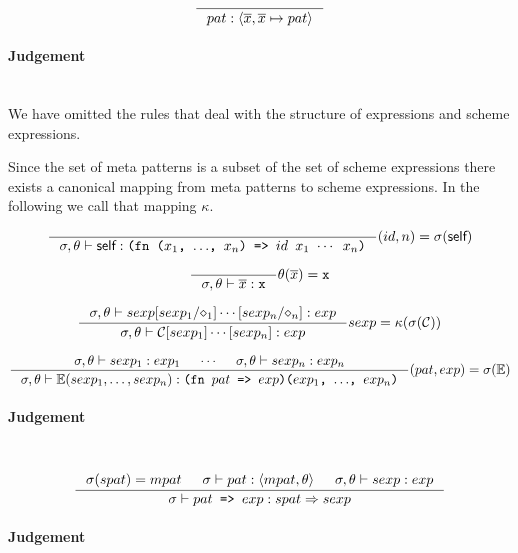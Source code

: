\[
\inference
{
}
{
  pat : \langle \overline{x}, \overline{x} \mapsto pat \rangle
}
\]

\paragraph{Judgement} \\

We have omitted the rules that deal with the structure of expressions and scheme
expressions.

Since the set of meta patterns is a subset of the set of scheme expressions
there exists a canonical mapping from meta patterns to scheme expressions. In
the following we call that mapping $\kappa$.


\[
\inference
{
}
{
  \sigma, \theta |- \textsf{self} : \texttt{(fn ($x_1$, $\ldots$, $x_n$) => $id$ $x_1$ $\cdots$ $x_n$)}
}
{
  (id, n) = \sigma(\textsf{self})
}
\]

\[
\inference
{
}
{
  \sigma, \theta |- \overline{x} : \texttt{x}
}
{
  \theta(\overline{x}) = \texttt{x}
}
\]

\[
\inference
{
  \sigma, \theta |- sexp[sexp_1/\diamond_1]\cdots[sexp_n/\diamond_n] : exp
}
{
  \sigma, \theta |- \mathcal{C}[sexp_1]\cdots[sexp_n] : exp
}
{
  sexp = \kappa(\sigma(\mathcal{C}))
}
\]

\[
\inference
{
  \sigma, \theta |- sexp_1 : exp_1 &
  \cdots &
  \sigma, \theta |- sexp_n : exp_n
}
{
  \sigma, \theta |- \mathbb{E}(sexp_1, \ldots, sexp_n) :
  \texttt{(fn $pat$ => $exp$)($exp_1$, $\ldots$, $exp_n$)}
}
{
  (pat, exp) = \sigma(\mathbb{E})
}
\]

\paragraph{Judgement} \\


\[
\inference
{
  \sigma(spat) = mpat &
  \sigma |- pat : \langle mpat, \theta \rangle &
  \sigma, \theta |- sexp : exp
}
{
  \sigma |- pat \texttt{ => } exp : spat => sexp
}
\]

\paragraph{Judgement} \\

